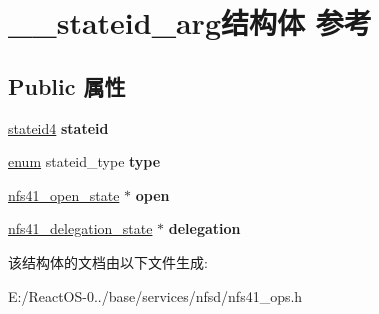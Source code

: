 \hypertarget{struct____stateid__arg}{}\section{\+\_\+\+\_\+stateid\+\_\+arg结构体 参考}
\label{struct____stateid__arg}
\subsection*{Public 属性}
\begin{DoxyCompactItemize}
\item 
\mbox{\label{struct____stateid__arg_abdfe46e722ec60b70b938ad1c3bc34cc}} 
\hyperlink{struct____stateid4}{stateid4} {\bfseries stateid}
\item 
\mbox{\label{struct____stateid__arg_a7f3bd3e3de4a6f73780b4ff5dc24eb60}} 
\hyperlink{interfaceenum}{enum} stateid\+\_\+type {\bfseries type}
\item 
\mbox{\label{struct____stateid__arg_a8714d0ea31e3753a7a5270de604c0f4b}} 
\hyperlink{struct____nfs41__open__state}{nfs41\+\_\+open\+\_\+state} $\ast$ {\bfseries open}
\item 
\mbox{\label{struct____stateid__arg_ad89d4f56b17d257687f44a1b5c07e49b}} 
\hyperlink{struct____nfs41__delegation__state}{nfs41\+\_\+delegation\+\_\+state} $\ast$ {\bfseries delegation}
\end{DoxyCompactItemize}


该结构体的文档由以下文件生成\+:\begin{DoxyCompactItemize}
\item 
E\+:/\+React\+O\+S-\/0../base/services/nfsd/nfs41\+\_\+ops.\+h\end{DoxyCompactItemize}
